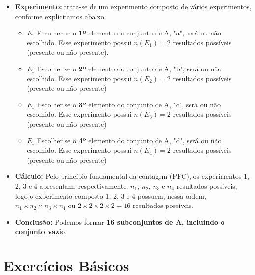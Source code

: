 \documentclass[a4paper,12pt]{article}
\begin{document}
\begin{enumerate}
\begin{itemize}
    \item[\ding{174}] \textbf{Experimento:} trata-se de um experimento composto de vários experimentos, conforme explicitamos abaixo.
      \begin{itemize}
          \item[\ding{172}] \textbf{$E_1$} Escolher se o \textbf{1º} elemento do conjunto de A, "a", será ou não escolhido. Esse experimento possui $n(E_1) = 2$ resultados possíveis (presente ou não presente).
          \item[\ding{173}] \textbf{$E_1$} Escolher se o \textbf{2º} elemento do conjunto de A, "b", será ou não escolhido. Esse experimento possui $n(E_2) = 2$ resultados possíveis (presente ou não presente)
          \item[\ding{174}] \textbf{$E_1$} Escolher se o \textbf{3º} elemento do conjunto de A, "c", será ou não escolhido. Esse experimento possui $n(E_3) = 2$ resultados possíveis (presente ou não presente)
          \item[\ding{175}] \textbf{$E_1$} Escolher se o \textbf{4º} elemento do conjunto de A, "d", será ou não escolhido. Esse experimento possui $n(E_4) = 2$ resultados possíveis (presente ou não presente)
      \end{itemize}
    
    \item[\ding{175}] \textbf{Cálculo:} Pelo princípio fundamental da contagem (PFC), os experimentos 1, 2, 3 e 4 apresentam, respectivamente, $n_{1},\, n_{2},\, n_{3} \textrm{ e } n_{4}$ resultados possíveis, logo o experimento composto 1, 2, 3 e 4 possuem, nessa ordem, $n_{1} \times n_{2} \times n_{3} \times n_{4}$ ou $2 \times 2 \times 2 \times 2 = 16$ resultados possíveis.
    
    \item[\ding{178}] \textbf{Conclusão:} Podemos formar \textbf{16 subconjuntos de A, incluindo o conjunto vazio}.
    
  \end{itemize}

\end{enumerate}

\section{Exercícios Básicos}
\end{document}
